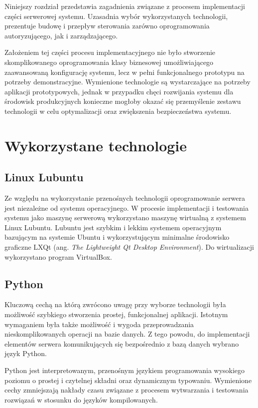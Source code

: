\label{chap:server}

    Niniejszy rozdział przedstawia zagadnienia związane z procesem implementacji części serwerowej systemu. Uzasadnia wybór wykorzystanych technologii, prezentuje budowę i przepływ sterowania zarówno oprogramowania autoryzującego, jak i zarządzającego.

    Założeniem tej części procesu implementacyjnego nie było stworzenie skomplikowanego oprogramowania klasy biznesowej umożliwiającego zaawansowaną konfigurację systemu, lecz w pełni funkcjonalnego prototypu na potrzeby demonstracyjne. Wymienione technologie są wystarczające na potrzeby aplikacji prototypowych, jednak w przypadku chęci rozwijania systemu dla środowisk produkcyjnych konieczne mogłoby okazać się przemyślenie zestawu technologii w celu optymalizacji oraz zwiększenia bezpieczeństwa systemu.

    \section{Wykorzystane technologie}

    	\subsection{Linux Lubuntu}

    		Ze względu na wykorzystanie przenośnych technologii oprogramowanie serwera jest niezależne od systemu operacyjnego. W procesie implementacji i testowania systemu jako maszynę serwerową wykorzystano maszynę wirtualną z systemem Linux Lubuntu. Lubuntu jest szybkim i lekkim systemem operacyjnym bazującym na systemie Ubuntu i wykorzystującym minimalne środowisko graficzne LXQt (ang. \textit{The Lightweight Qt Desktop Environment}). Do wirtualizacji wykorzystano program VirtualBox.

    	
    	\subsection{Python}

    		Kluczową cechą na którą zwrócono uwagę przy wyborze technologii była możliwość szybkiego stworzenia prostej, funkcjonalnej aplikacji. Istotnym wymaganiem była także możliwość i wygoda przeprowadzania nieskomplikowanych operacji na bazie danych. Z tego powodu, do implementacji elementów serwera komunikujących się bezpośrednio z bazą danych wybrano język Python.

    		Python jest interpretowanym, przenośnym językiem programowania wysokiego poziomu o prostej i czytelnej składni oraz dynamicznym typowaniu. Wymienione cechy zmniejszają nakłady czasu związane z procesem wytwarzania i testowania rozwiązań w stosunku do języków kompilowanych.

